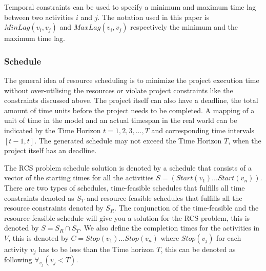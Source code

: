 \documentclass{article}
\begin{document}
Temporal constraints can be used to specify a minimum and maximum time lag between two activities $i$ and $j$.
The notation used in this paper is $MinLag(v_i, v_j)$ and $MaxLag(v_i, v_j)$ respectively the minimum and the maximum time lag.

\subsubsection{Schedule}
The general idea of resource scheduling is to minimize the project execution time without over-utilising the resources or violate project constraints like the constraints discussed above.
The project itself can also have a deadline, the total amount of time units before the project needs to be completed.
A mapping of a unit of time in the model and an actual timespan in the real world can be indicated by the Time Horizon $t=1,2,3,\ldots,T$ and corresponding time intervals $[t-1,t]$.
The generated schedule may not exceed the Time Horizon $T$, when the project itself has an deadline.

The RCS problem schedule solution is denoted by a schedule that consists of a vector of the starting times for all the activities $S =  (Start(v_1) \ldots Start(v_n))$.
There are two types of schedules, time-feasible schedules that fulfills all time constraints denoted as $S_T$ and resource-feasible schedules that fulfills all the resource constraints denoted by $S_R$.
The conjunction of the time-feasible and the resource-feasible schedule will give you a solution for the RCS problem, this is denoted by $S = S_R \cap S_T$.
We also define the completion times for the activities in $V$, this is denoted by $C = Stop(v_1) \ldots Stop(v_n)$ where $Stop(v_j)$ for each activity $v_j$ has to be less than the Time horizon $T$, this can be denoted as following $\forall_{v_j}(v_j < T)$.
\end{document}
